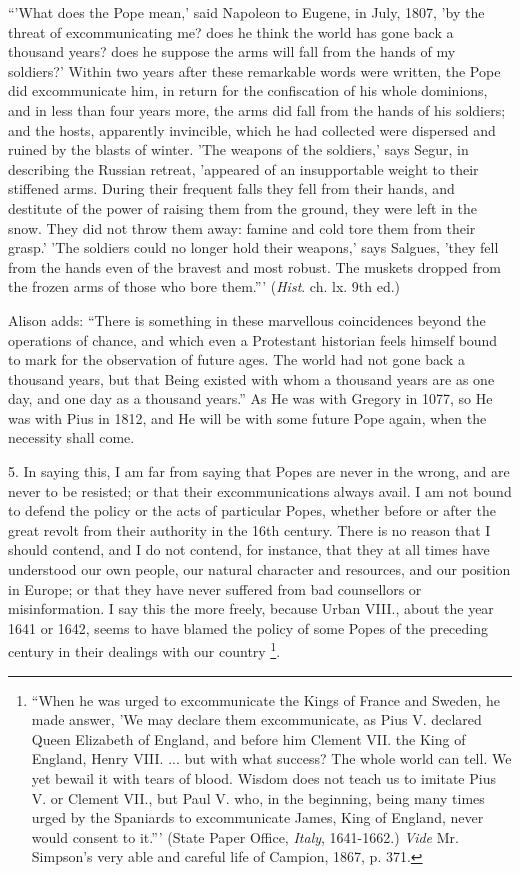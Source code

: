 ``'What does the Pope mean,' said Napoleon to Eugene, in July,
1807, 'by the threat of excommunicating me? does he think the world has
gone back a thousand years? does he suppose the arms will fall from the
hands of my soldiers?' Within two years after these remarkable
words were written, the Pope did excommunicate him, in return for the
confiscation of his whole dominions, and in less than four years more,
the arms did fall from the hands of his soldiers; and the hosts,
apparently invincible, which he had collected were dispersed and ruined
by the blasts of winter. 'The weapons of the soldiers,' says Segur, in
describing the Russian retreat, 'appeared of an insupportable weight to
their stiffened arms. During their frequent falls they fell from their
hands, and destitute of the power of raising them from the ground, they
were left in the snow. They did not throw them away: famine and cold
tore them from their grasp.' 'The soldiers could no longer hold their
weapons,' says Salgues, 'they fell from the hands even of the bravest
and most robust. The muskets dropped from the frozen arms of those who
bore them.''' (\emph{Hist}. ch. lx. 9th ed.)

Alison adds: ``There is something in these marvellous
coincidences beyond the operations of chance, and which even a
Protestant historian feels himself bound to mark for the observation of
future ages. The world had not gone back a thousand years, but that
Being existed with whom a thousand years are as one day, and one day as
a thousand years.'' As He was with Gregory in 1077, so He was with
Pius in 1812, and He will be with some future Pope again, when the
necessity shall come.

5. In saying this, I am far from saying that Popes are never in the
wrong, and are never to be resisted; or that their excommunications
always avail. I am not bound to defend the policy or the acts of
particular Popes, whether before or after the great revolt from
their authority in the 16th century. There is no reason that I should
contend, and I do not contend, for instance, that they at all times have
understood our own people, our natural character and resources, and our
position in Europe; or that they have never suffered from bad
counsellors or misinformation. I say this the more freely, because Urban
VIII., about the year 1641 or 1642, seems to have blamed the policy of
some Popes of the preceding century in their dealings with our country \footnote{``When he was urged to excommunicate the
Kings of France and Sweden, he made answer, 'We may declare them
excommunicate, as Pius V. declared Queen Elizabeth of England, and
before him Clement VII. the King of England, Henry VIII. ... but with
what success? The whole world can tell. We yet bewail it with tears of
blood. Wisdom does not teach us to imitate Pius V. or Clement VII., but
Paul V. who, in the beginning, being many times urged by the Spaniards
to excommunicate James, King of England, never would consent to
it.''' (State Paper Office, \emph{Italy}, 1641-1662.) \emph{Vide}
Mr. Simpson's very able and careful life of Campion, 1867, p. 371.}.


